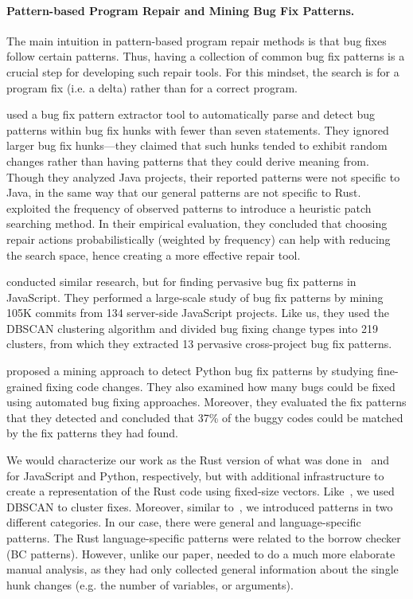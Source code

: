 \paragraph{Pattern-based Program Repair and Mining Bug Fix Patterns.}
The main intuition in pattern-based program repair methods is that bug fixes follow certain patterns. Thus, having a collection of common bug fix patterns is a crucial step for developing such repair tools. For this mindset, the search is for a program fix (i.e. a delta) rather than for a correct program.

\cite{pan2009toward} used a bug fix pattern extractor tool to automatically parse and detect bug patterns within bug fix hunks with fewer than seven statements. They ignored larger bug fix hunks---they claimed that such hunks tended to exhibit random changes rather than having patterns that they could derive meaning from. Though they analyzed Java projects, their reported patterns were not specific to Java, in the same way that our general patterns are not specific to Rust. \cite{martinez2015mining,martinez2012mining} exploited the frequency of observed patterns to introduce a heuristic patch searching method. In their empirical evaluation, they concluded that choosing repair actions probabilistically (weighted by frequency) can help with reducing the search space, hence creating a more effective repair tool.

\cite{hanam2016discovering} conducted similar research, but for finding pervasive bug fix patterns in JavaScript. They performed a large-scale study of bug fix patterns by mining 105K commits from 134 server-side JavaScript projects. Like us, they used the DBSCAN clustering algorithm and divided bug fixing change types into 219 clusters, from which they extracted 13 pervasive cross-project bug fix patterns. 

\cite{yang2022mining} proposed a mining approach to detect Python bug fix patterns by studying fine-grained fixing code changes. They also examined how many bugs could be fixed using automated bug fixing approaches. Moreover, they evaluated the fix patterns that they detected and concluded that 37\% of the buggy codes could be matched by the fix patterns they had found. 

We would characterize our work as the Rust version of what was done in~\cite{hanam2016discovering} and~\cite{yang2022mining} for JavaScript and Python, respectively, but with additional infrastructure to create a representation of the Rust code using fixed-size vectors. Like~\cite{hanam2016discovering}, we used DBSCAN to cluster fixes. Moreover, similar to~\cite{yang2022mining}, we introduced patterns in two different categories. In our case, there were general and language-specific patterns. The Rust language-specific patterns were related to the borrow checker (BC patterns). However, unlike our paper, \cite{yang2022mining} needed to do a much more elaborate manual analysis, as they had only collected general information about the single hunk changes (e.g. the number of variables, or arguments).

